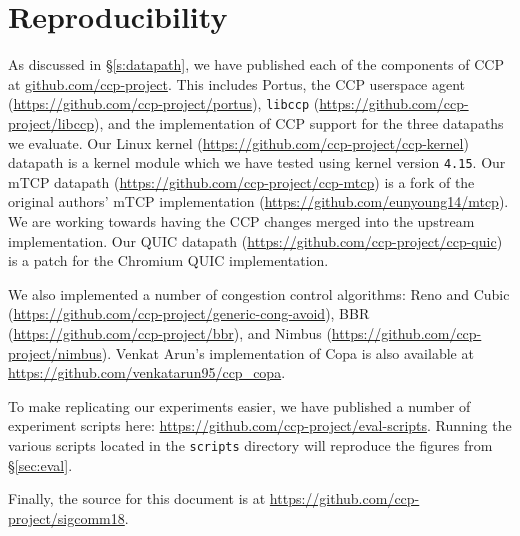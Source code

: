 \section{Reproducibility}
\label{sec:repro}

As discussed in \S\ref{s:datapath}, we have published each of the components of CCP at \url{github.com/ccp-project}. 
This includes Portus, the CCP userspace agent (\url{https://github.com/ccp-project/portus}), \texttt{libccp} (\url{https://github.com/ccp-project/libccp}), and the implementation of CCP support for the three datapaths we evaluate. 
Our Linux kernel (\url{https://github.com/ccp-project/ccp-kernel}) datapath is a kernel module which we have tested using kernel version \texttt{4.15}. 
Our mTCP datapath (\url{https://github.com/ccp-project/ccp-mtcp}) is a fork of the original authors' mTCP implementation (\url{https://github.com/eunyoung14/mtcp}). We are working towards having the CCP changes merged into the upstream implementation.
Our QUIC datapath (\url{https://github.com/ccp-project/ccp-quic}) is a patch for the Chromium QUIC implementation. 

We also implemented a number of congestion control algorithms: Reno and Cubic (\url{https://github.com/ccp-project/generic-cong-avoid}), BBR (\url{https://github.com/ccp-project/bbr}), and Nimbus (\url{https://github.com/ccp-project/nimbus}). Venkat Arun's implementation of Copa is also available at \url{https://github.com/venkatarun95/ccp_copa}.

To make replicating our experiments easier, we have published a number of experiment scripts here: \url{https://github.com/ccp-project/eval-scripts}. Running the various scripts located in the \texttt{scripts} directory will reproduce the figures from \S\ref{sec:eval}.

Finally, the source for this document is at \url{https://github.com/ccp-project/sigcomm18}.

